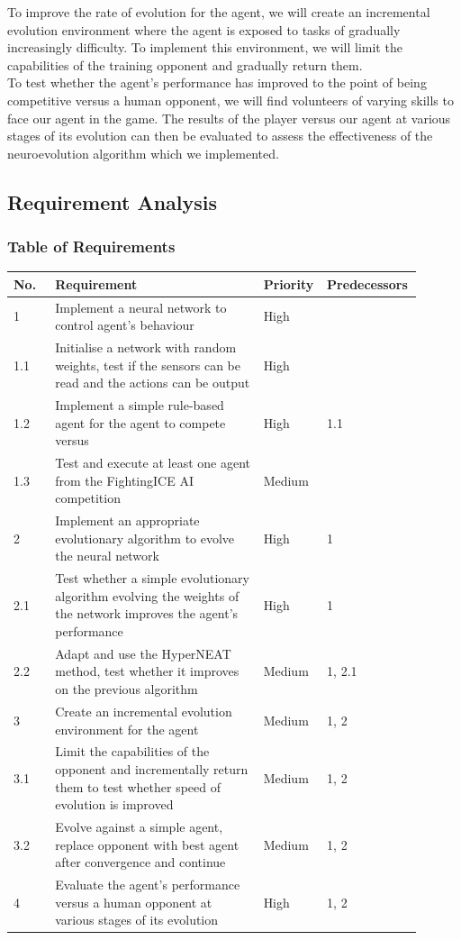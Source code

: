 \documentclass[11pt,a4paper]{article}
\begin{document}
To improve the rate of evolution for the agent, we will create an incremental evolution environment where the agent is exposed to tasks of gradually increasingly difficulty. To implement this environment, we will limit the capabilities of the training opponent and gradually return them.\\

To test whether the agent's performance has improved to the point of being competitive versus a human opponent, we will find volunteers of varying skills to face our agent in the game. The results of the player versus our agent at various stages of its evolution can then be evaluated to assess the effectiveness of the neuroevolution algorithm which we implemented.
\newpage
\subsection{Requirement Analysis}
\subsubsection{Table of Requirements}
\begin{tabular}{|p{0.1\linewidth}|p{0.5\linewidth}|p{0.1\linewidth}|p{0.2\linewidth}|}
\hline
No. & Requirement & Priority & Predecessors\\ \hline
1 & Implement a neural network to control agent's behaviour & High &\\ \hline
1.1 & Initialise a network with random weights, test if the sensors can be read and the actions can be output & High &\\ \hline
1.2 & Implement a simple rule-based agent for the agent to compete versus & High & 1.1\\ \hline
1.3 & Test and execute at least one agent from the FightingICE AI competition & Medium &\\ \hline
2 & Implement an appropriate evolutionary algorithm to evolve the neural network & High & 1\\ \hline
2.1 & Test whether a simple evolutionary algorithm evolving the weights of the network improves the agent's performance & High & 1\\ \hline
2.2 & Adapt and use the HyperNEAT method, test whether it improves on the previous algorithm & Medium & 1, 2.1\\ \hline
3 & Create an incremental evolution environment for the agent & Medium & 1, 2\\ \hline
3.1 & Limit the capabilities of the opponent and incrementally return them to test whether speed of evolution is improved & Medium & 1, 2\\ \hline
3.2 & Evolve against a simple agent, replace opponent with best agent after convergence and continue & Medium & 1, 2\\ \hline 
4 & Evaluate the agent's performance versus a human opponent at various stages of its evolution & High & 1, 2\\ \hline
\end{tabular}
\newpage
\end{document}
